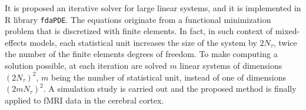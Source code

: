 
It is proposed an iterative solver for large linear systems, and it 
is implemented in R library \texttt{fdaPDE}.
The equations originate from a functional minimization problem
that is discretized with finite elements. In fact,
in such context of mixed-effects models,
each statistical unit increases the size of the system by $2 N_{\tau}$, twice the number of
the finite elements degrees of freedom.\newline
To make computing a solution possible, at each iteration are solved 
$m$ linear systems of dimensions $\left(2 N_{\tau}\right)^2$,
$m$ being the number of statistical unit, instead of one of
dimensions $\left(2m N_{\tau}\right)^2$.\newline
A simulation study is carried out and the proposed
method is finally applied to fMRI data in the cerebral cortex.
